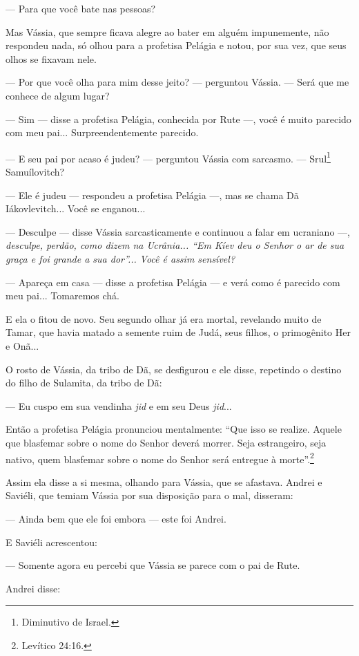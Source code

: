--- Para que você bate nas pessoas?

Mas Vássia, que sempre ficava alegre ao bater em alguém impunemente, não
respondeu nada, só olhou para a profetisa Pelágia e notou, por sua vez,
que seus olhos se fixavam nele.

--- Por que você olha para mim desse jeito? --- perguntou Vássia. ---
Será que me conhece de algum lugar?

--- Sim --- disse a profetisa Pelágia, conhecida por Rute ---, você é
muito parecido com meu pai... Surpreendentemente parecido.

--- E seu pai por acaso é judeu? --- perguntou Vássia com sarcasmo. ---
Srul\footnote{Diminutivo de Israel.} Samuílovitch?

--- Ele é judeu --- respondeu a profetisa Pelágia ---, mas se chama Dã
Iákovlevitch... Você se enganou...

--- Desculpe --- disse Vássia sarcasticamente e continuou a falar em
ucraniano ---, \emph{desculpe, perdão, como dizem na Ucrânia... ``Em
Kíev deu o Senhor o ar de sua graça e foi grande a sua dor''...}
\emph{Você é assim sensível? }

--- Apareça em casa --- disse a profetisa Pelágia --- e verá como é
parecido com meu pai... Tomaremos chá.

E ela o fitou de novo. Seu segundo olhar já era mortal, revelando muito
de Tamar, que havia matado a semente ruim de Judá, seus filhos, o
primogênito Her e Onã...

O rosto de Vássia, da tribo de Dã, se desfigurou e ele disse, repetindo
o destino do filho de Sulamita, da tribo de Dã:

--- Eu cuspo em sua vendinha \emph{jid} e em seu Deus \emph{jid}...

Então a profetisa Pelágia pronunciou mentalmente: ``Que isso se realize.
Aquele que blasfemar sobre o nome do Senhor deverá morrer. Seja
estrangeiro, seja nativo, quem blasfemar sobre o nome do Senhor será
entregue à morte''.\footnote{Levítico 24:16.}

Assim ela disse a si mesma, olhando para Vássia, que se afastava. Andrei
e Saviéli, que temiam Vássia por sua disposição para o mal, disseram:

--- Ainda bem que ele foi embora --- este foi Andrei.

E Saviéli acrescentou:

--- Somente agora eu percebi que Vássia se parece com o pai de Rute.

Andrei disse:

